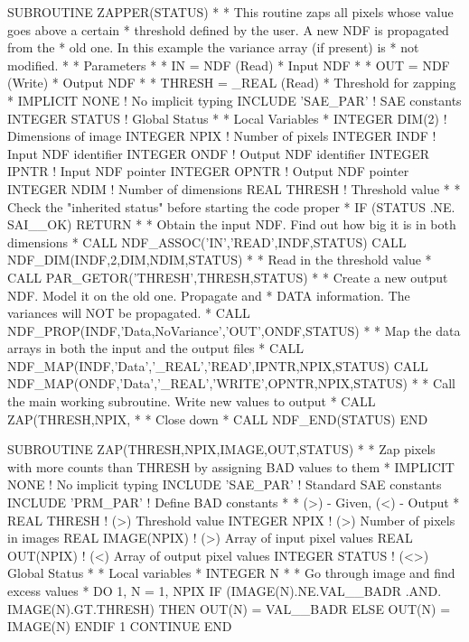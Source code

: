 \documentclass[11pt,nolof]{starlink}
\begin{document}
\begin{small}
\begin{terminalv}
      SUBROUTINE ZAPPER(STATUS)
*
* This routine zaps all pixels whose value goes above a certain
* threshold defined by the user. A new NDF is propagated from the
* old one. In this example the variance array (if present) is
* not modified.
*
* Parameters
*
* IN = NDF (Read)
*  Input NDF
*
* OUT = NDF (Write)
*  Output NDF
*
* THRESH = _REAL (Read)
*  Threshold for zapping
*
      IMPLICIT NONE     ! No implicit typing
      INCLUDE 'SAE_PAR' ! SAE constants
      INTEGER STATUS    ! Global Status
*
* Local Variables
*
      INTEGER DIM(2)    ! Dimensions of image
      INTEGER NPIX      ! Number of pixels
      INTEGER INDF      ! Input NDF identifier
      INTEGER ONDF      ! Output NDF identifier
      INTEGER IPNTR     ! Input NDF pointer
      INTEGER OPNTR     ! Output NDF pointer
      INTEGER NDIM      ! Number of dimensions
      REAL THRESH       ! Threshold value
*
* Check the "inherited status" before starting the code proper
*
      IF (STATUS .NE. SAI__OK) RETURN
*
* Obtain the input NDF. Find out how big it is in both dimensions
*
      CALL NDF_ASSOC('IN','READ',INDF,STATUS)
      CALL NDF_DIM(INDF,2,DIM,NDIM,STATUS)
*
* Read in the threshold value
*
      CALL PAR_GETOR('THRESH',THRESH,STATUS)
*
* Create a new output NDF. Model it on the old one. Propagate and
* DATA information. The variances will NOT be propagated.
*
      CALL NDF_PROP(INDF,'Data,NoVariance','OUT',ONDF,STATUS)
*
* Map the data arrays in both the input and the output files
*
      CALL NDF_MAP(INDF,'Data','_REAL','READ',IPNTR,NPIX,STATUS)
      CALL NDF_MAP(ONDF,'Data','_REAL','WRITE',OPNTR,NPIX,STATUS)
*
* Call the main working subroutine. Write new values to output
*
      CALL ZAP(THRESH,NPIX,%
*
* Close down
*
      CALL NDF_END(STATUS)
      END

      SUBROUTINE ZAP(THRESH,NPIX,IMAGE,OUT,STATUS)
*
* Zap pixels with more counts than THRESH by assigning BAD values to them
*
      IMPLICIT NONE       ! No implicit typing
      INCLUDE 'SAE_PAR'   ! Standard SAE constants
      INCLUDE 'PRM_PAR'   ! Define BAD constants
*
* (>) - Given,  (<) - Output
*
      REAL THRESH         ! (>) Threshold value
      INTEGER NPIX        ! (>) Number of pixels in images
      REAL IMAGE(NPIX)    ! (>) Array of input pixel values
      REAL OUT(NPIX)      ! (<) Array of output pixel values
      INTEGER STATUS      ! (<>) Global Status
*
* Local variables
*
      INTEGER N
*
* Go through image and find excess values
*
      DO 1, N = 1, NPIX
        IF (IMAGE(N).NE.VAL__BADR .AND. IMAGE(N).GT.THRESH) THEN
          OUT(N) = VAL__BADR
        ELSE
          OUT(N) = IMAGE(N)
        ENDIF
 1    CONTINUE
      END
\end{terminalv}
\end{small}
\end{document}
